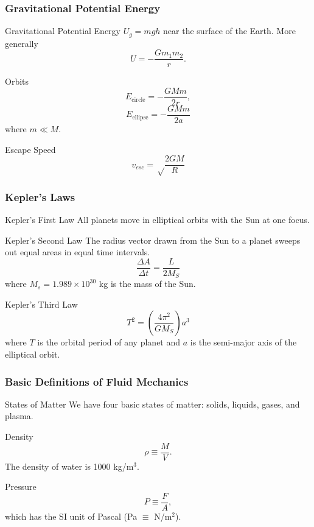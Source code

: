 \documentclass[letterpaper]{beamer}
\begin{document}
\begin{frame}
\frametitle{Gravitational Potential Energy}

\begin{block}{Gravitational Potential Energy}
$U_g = mgh$ near the surface of the Earth. More generally $$U = -\frac{Gm_1m_2}{r}.$$
\end{block}

\begin{block}{Orbits}
$$E_\text{circle} = -\frac{GMm}{2r},$$
$$E_\text{ellipse} = -\frac{GMm}{2a}$$ where $m \ll M$.
\end{block}

\begin{block}{Escape Speed}
$$v_{esc}=\sqrt\frac{2GM}{R}$$
\end{block}
\end{frame}

\begin{frame}
\frametitle{Kepler's Laws}
\vspace{-8pt}
\begin{block}{Kepler's First Law}
All planets move in elliptical orbits with the Sun at one focus.
\end{block}

\begin{block}{Kepler's Second Law}
The radius vector drawn from the Sun to a planet sweeps out equal areas in equal time intervals.
$$\frac{\Delta A}{\Delta t} = \frac{L}{2M_S}$$
where $M_s = 1.989 \times 10^{30}$ kg is the mass of the Sun.
\end{block}

\begin{block}{Kepler's Third Law}
$$T^2 = \left(\frac{4\pi^2}{GM_S}\right)a^3$$
where $T$ is the orbital period of any planet and $a$ is the semi-major axis of the elliptical orbit.
\end{block}
\end{frame}

\begin{frame}
\frametitle{Basic Definitions of Fluid Mechanics}

\begin{block}{States of Matter}
We have four basic states of matter: solids, liquids, gases, and plasma.
\end{block}

\begin{block}{Density}
$$\rho \equiv \frac{M}{V}.$$ The density of water is 1000 kg/m$^3$.
\end{block}

\begin{block}{Pressure}
$$P \equiv \frac{F}{A},$$ which has the SI unit of Pascal (Pa $\equiv$ N/m$^2$).
\end{block}
\end{frame}
\end{document}
